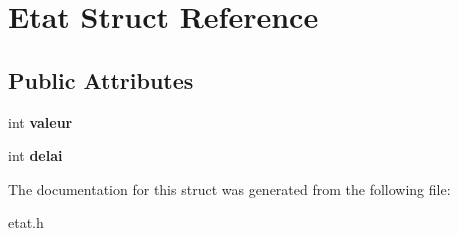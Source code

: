 \hypertarget{structEtat}{}\section{Etat Struct Reference}
\label{structEtat}
\subsection*{Public Attributes}
\begin{DoxyCompactItemize}
\item 
\mbox{\label{structEtat_a225c302df2fff80eca2b7025f7e391ae}} 
int {\bfseries valeur}
\item 
\mbox{\label{structEtat_aabf0593cdcf5540d4fc09007a05f9e26}} 
int {\bfseries delai}
\end{DoxyCompactItemize}


The documentation for this struct was generated from the following file\+:\begin{DoxyCompactItemize}
\item 
etat.\+h\end{DoxyCompactItemize}
